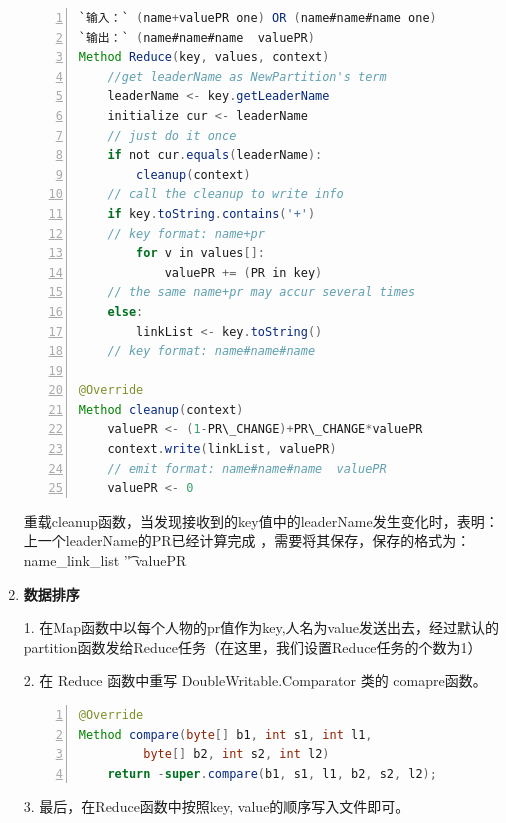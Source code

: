\documentclass{ctexart}
\begin{document}
\begin{enumerate}[I]
		\begin{lstlisting}[language=java, numbers=left, numberstyle=\tiny, frame=shadowbox, basicstyle=\ttfamily, escapeinside=``]
`输入：` (name+valuePR one) OR	(name#name#name one)
`输出：` (name#name#name  valuePR)
Method Reduce(key, values, context)
	//get leaderName as NewPartition's term
	leaderName <- key.getLeaderName
	initialize cur <- leaderName
	// just do it once
	if not cur.equals(leaderName):
		cleanup(context)
	// call the cleanup to write info
	if key.toString.contains('+')
	// key format: name+pr
		for v in values[]:
			valuePR += (PR in key)
	// the same name+pr may accur several times
	else:
		linkList <- key.toString()
	// key format: name#name#name
		
@Override 
Method cleanup(context)
	valuePR <- (1-PR\_CHANGE)+PR\_CHANGE*valuePR
	context.write(linkList, valuePR)
	// emit format: name#name#name	valuePR
	valuePR <- 0
		\end{lstlisting}
	\par 重载cleanup函数，当发现接收到的key值中的leaderName发生变化时，表明：上一个leaderName的PR已经计算完成
	，需要将其保存，保存的格式为：name\_link\_list '\t' valuePR 
		
		\item \textbf{ 数据排序}
		\par 1. 在Map函数中以每个人物的pr值作为key,人名为value发送出去，经过默认的partition函数发给Reduce任务（在这里，我们设置Reduce任务的个数为1）
		\par 2. 在 Reduce 函数中重写 DoubleWritable.Comparator 类的 comapre函数。
	

		\begin{lstlisting}[language=java, numbers=left, numberstyle=\tiny, frame=shadowbox, basicstyle=\ttfamily, escapeinside=``]
@Override
Method compare(byte[] b1, int s1, int l1, 
		 byte[] b2, int s2, int l2) 
    return -super.compare(b1, s1, l1, b2, s2, l2);
		\end{lstlisting}	
		\par 3. 最后，在Reduce函数中按照key, value的顺序写入文件即可。
	\end{enumerate}
	
\end{document}
